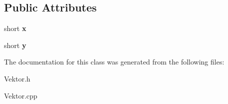 \subsection*{Public Attributes}
\begin{DoxyCompactItemize}
\item 
\hypertarget{class_vektor_a8f196cfe8c53a0e5300084fcd30024d0}{short {\bfseries x}}\label{class_vektor_a8f196cfe8c53a0e5300084fcd30024d0}

\item 
\hypertarget{class_vektor_a9d444d909ee6b1092085dd6c60023e48}{short {\bfseries y}}\label{class_vektor_a9d444d909ee6b1092085dd6c60023e48}

\end{DoxyCompactItemize}


The documentation for this class was generated from the following files\-:\begin{DoxyCompactItemize}
\item 
Vektor.\-h\item 
Vektor.\-cpp\end{DoxyCompactItemize}
